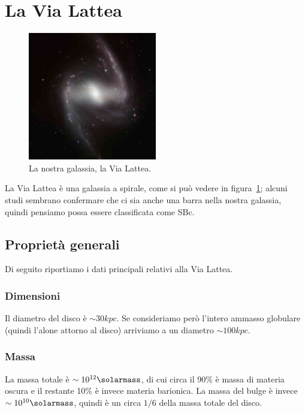 \section{La Via Lattea}\label{sec:via-lattea}
\begin{figure}
    \centering
    \includegraphics[width = 0.5\textwidth]{immagini/via-lattea.jpg}
    \caption{La nostra galassia, la Via Lattea.}
    \label{fig:via-lattea}
\end{figure}

La Via Lattea è una galassia a spirale, come si può vedere in figura~\ref{fig:via-lattea}; alcuni studi sembrano confermare che ci sia anche una barra nella nostra galassia, quindi pensiamo possa essere classificata come SBc. 

\subsection{Proprietà generali}
Di seguito riportiamo i dati principali relativi alla Via Lattea.

\subsubsection{Dimensioni}
Il diametro del disco è $\sim 30 kpc$. Se consideriamo però l'intero ammasso globulare (quindi l'alone attorno al disco) arriviamo a un diametro $\sim 100 kpc$.

\subsubsection{Massa}
La massa totale è $\sim 10^{12} \si{\solarmass}$, di cui circa il 90\% è massa di materia oscura e il restante 10\% è invece materia barionica. 
La massa del bulge è invece $\sim 10^{10} \si{\solarmass}$, quindi è un circa $1/6$ della massa totale del disco.

